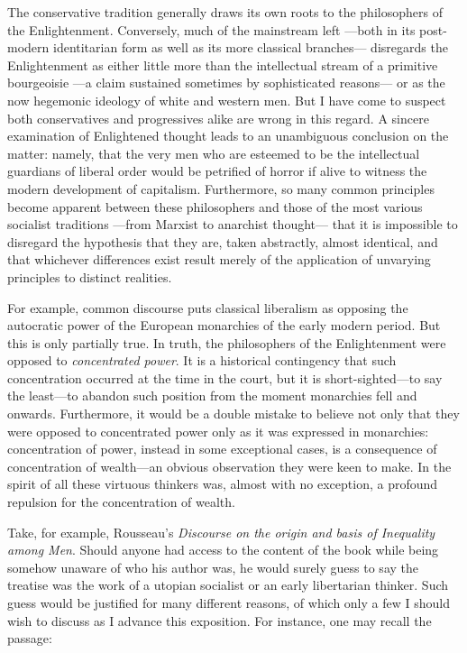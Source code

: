 \documentclass[a4paper]{article}
\begin{document}
The conservative tradition generally draws its own roots to the philosophers of
the Enlightenment. Conversely, much of the mainstream left ---both in its
post-modern identitarian form as well as its more classical branches---
disregards the Enlightenment as either little more than the intellectual
stream of a primitive bourgeoisie ---a claim sustained sometimes by sophisticated
reasons--- or as the now hegemonic ideology of white and western men. But I have
come to suspect both conservatives and progressives alike are wrong in this
regard. A sincere examination of Enlightened thought leads to an unambiguous
conclusion on the matter: namely, that the very men who are esteemed to be the
intellectual guardians of liberal order would be petrified of horror if alive to
witness the modern development of capitalism. Furthermore, so many common
principles become apparent between these philosophers and those of the most
various socialist traditions ---from Marxist to anarchist thought--- that it is
impossible to disregard the hypothesis that they are, taken abstractly, almost
identical, and that whichever differences exist result merely of the application
of unvarying principles to distinct realities.



For example, common discourse puts classical liberalism as opposing the
autocratic power of the European monarchies of the early modern period. But this
is only partially true. In truth, the philosophers of the Enlightenment were
opposed to \textit{concentrated power}. It is a historical contingency that such
concentration occurred at the time in the court, but it is short-sighted---to
say the least---to abandon such position from the moment monarchies fell and
onwards. Furthermore, it would be a double mistake to believe not only that they
were opposed to concentrated power only as it was expressed in monarchies:
concentration of power, instead in some exceptional cases, is a consequence of
concentration of wealth---an obvious observation they were keen to make. In the
spirit of all these virtuous thinkers was, almost with no exception, a profound
repulsion for the concentration of wealth.

Take, for example, Rousseau's \textit{Discourse on the origin and basis of
Inequality among Men}. Should anyone had access to the content of the book while
being somehow unaware of who his author was, he would surely guess to say the treatise
was the work of a utopian socialist or an early libertarian thinker. Such guess
would be justified for many different reasons, of which only a few I should wish
to discuss as I advance this exposition. For instance, one may recall the
passage:
\end{document}
